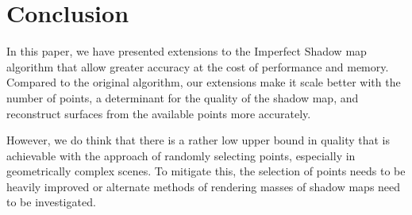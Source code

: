 \section{Conclusion}

In this paper, we have presented extensions to the Imperfect Shadow map algorithm that allow greater accuracy at the cost of performance and memory. Compared to the original algorithm, our extensions make it scale better with the number of points, a determinant for the quality of the shadow map, and reconstruct surfaces from the available points more accurately.

However, we do think that there is a rather low upper bound in quality that is achievable with the approach of randomly selecting points, especially in geometrically complex scenes. To mitigate this, the selection of points needs to be heavily improved or alternate methods of rendering masses of shadow maps need to be investigated.

